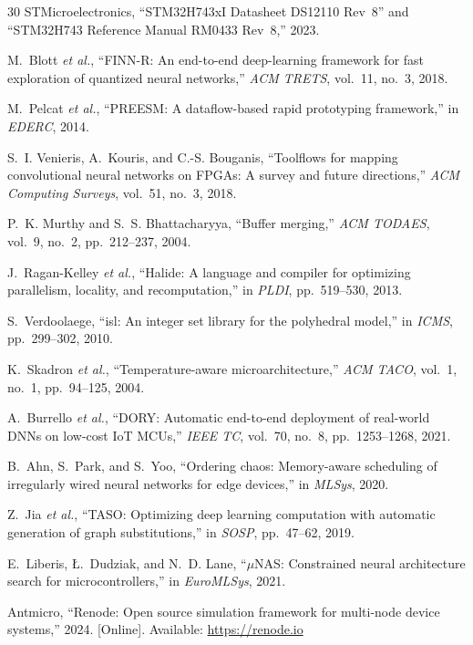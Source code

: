 \documentclass[journal]{IEEEtran}
\begin{document}
\begin{thebibliography}{30}
STMicroelectronics, ``STM32H743xI Datasheet DS12110 Rev~8'' and ``STM32H743 Reference Manual RM0433 Rev~8,'' 2023.

M.~Blott \emph{et al.}, ``FINN-R: An end-to-end deep-learning framework for fast exploration of quantized neural networks,'' \emph{ACM TRETS}, vol.~11, no.~3, 2018.

M.~Pelcat \emph{et al.}, ``PREESM: A dataflow-based rapid prototyping framework,'' in \emph{EDERC}, 2014.

S.~I. Venieris, A.~Kouris, and C.-S. Bouganis, ``Toolflows for mapping convolutional neural networks on FPGAs: A survey and future directions,'' \emph{ACM Computing Surveys}, vol.~51, no.~3, 2018.

P.~K. Murthy and S.~S. Bhattacharyya, ``Buffer merging,'' \emph{ACM TODAES}, vol.~9, no.~2, pp.~212--237, 2004.

J.~Ragan-Kelley \emph{et al.}, ``Halide: A language and compiler for optimizing parallelism, locality, and recomputation,'' in \emph{PLDI}, pp.~519--530, 2013.

S.~Verdoolaege, ``isl: An integer set library for the polyhedral model,'' in \emph{ICMS}, pp.~299--302, 2010.

K.~Skadron \emph{et al.}, ``Temperature-aware microarchitecture,'' \emph{ACM TACO}, vol.~1, no.~1, pp.~94--125, 2004.

A.~Burrello \emph{et al.}, ``DORY: Automatic end-to-end deployment of real-world DNNs on low-cost IoT MCUs,'' \emph{IEEE TC}, vol.~70, no.~8, pp.~1253--1268, 2021.

B.~Ahn, S.~Park, and S.~Yoo, ``Ordering chaos: Memory-aware scheduling of irregularly wired neural networks for edge devices,'' in \emph{MLSys}, 2020.

Z.~Jia \emph{et al.}, ``TASO: Optimizing deep learning computation with automatic generation of graph substitutions,'' in \emph{SOSP}, pp.~47--62, 2019.

E.~Liberis, \L.~Dudziak, and N.~D. Lane, ``$\mu$NAS: Constrained neural architecture search for microcontrollers,'' in \emph{EuroMLSys}, 2021.

Antmicro, ``Renode: Open source simulation framework for multi-node device systems,'' 2024. [Online]. Available: \url{https://renode.io}


\end{thebibliography}
\end{document}
